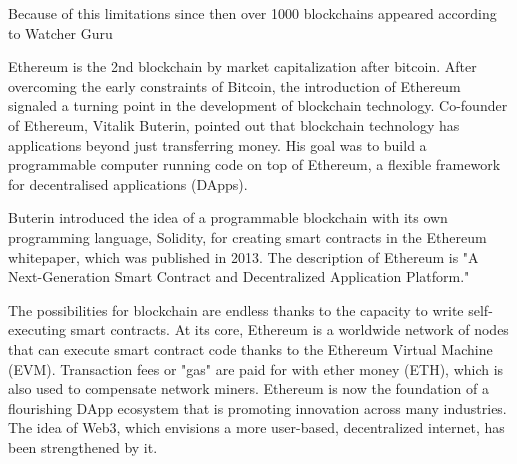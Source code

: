 Because of this limitations since then over 1000 blockchains appeared according to Watcher Guru \cite{watcherguru}
\par Ethereum is the 2nd blockchain by market capitalization after bitcoin. After overcoming the early constraints of Bitcoin, the introduction of Ethereum signaled a turning point in the development of blockchain technology. Co-founder of Ethereum, Vitalik Buterin, pointed out that blockchain technology has applications beyond just transferring money. His goal was to build a programmable computer running code on top of Ethereum, a flexible framework for decentralised applications (DApps).
\par Buterin introduced the idea of a programmable blockchain with its own programming language, Solidity, for creating smart contracts in the Ethereum whitepaper, which was published in 2013. The description of Ethereum is "A Next-Generation Smart Contract and Decentralized Application Platform." \cite{ethereumwhitepaper}
\par The possibilities for blockchain are endless thanks to the capacity to write self-executing smart contracts. At its core, Ethereum is a worldwide network of nodes that can execute smart contract code thanks to the Ethereum Virtual Machine (EVM). Transaction fees or "gas" are paid for with ether money (ETH), which is also used to compensate network miners. Ethereum is now the foundation of a flourishing DApp ecosystem that is promoting innovation across many industries. The idea of Web3, which envisions a more user-based, decentralized internet, has been strengthened by it.

